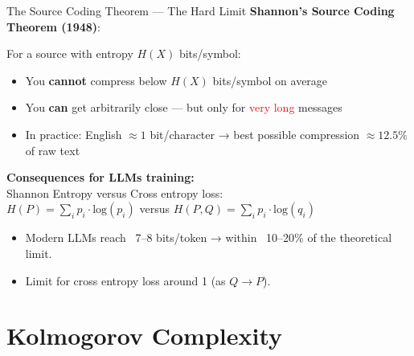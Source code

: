 \documentclass{beamer}
\begin{document}
\begin{frame}{The Source Coding Theorem — The Hard Limit}
\small
\textbf{Shannon’s Source Coding Theorem (1948)}:

For a source with entropy $H(X)$ bits/symbol:

\begin{itemize}
    \item You \textbf{cannot} compress below $H(X)$ bits/symbol on average
    \item You \textbf{can} get arbitrarily close — but only for \textcolor{red}{very long} messages
    \item In practice: English $\approx 1$ bit/character → best possible compression $\approx 12.5\%$ of raw text
\end{itemize}

\vspace{.5cm}
\small
\textbf{Consequences for LLMs training:} \\


\vspace{0.2cm}
\small
Shannon Entropy  versus Cross entropy loss: \\
$H(P)=\sum_i p_i \cdot \mathrm{log}(p_i)$ versus 
$H(P, Q)=\sum_i p_i \cdot \mathrm{log}(q_i)$ 

\begin{itemize}
    \item Modern LLMs reach ~7–8 bits/token → within ~10–20\% of the theoretical limit.
    \item Limit for cross entropy loss around 1 (as $Q \to P$). 

\end{itemize}
\end{frame}


\section{Kolmogorov Complexity}
\end{document}
